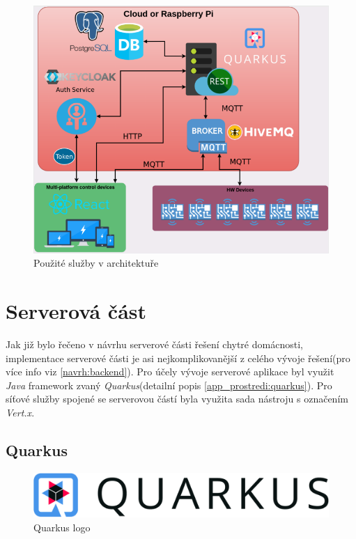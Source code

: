 \begin{figure}[hbt]
  \centering
  \includegraphics[width=0.9 \linewidth]{obrazky-figures/technologie.png}
  \caption{Použité služby v architektuře}
  \label{figure:technologie_architektura}
\end{figure}

\newpage
\section{Serverová část}
\label{pouzite:backend}
Jak již bylo řečeno v návrhu serverové části řešení chytré domácnosti, implementace serverové části je asi nejkomplikovanější z celého vývoje řešení(pro více info viz \ref{navrh:backend}).
Pro účely vývoje serverové aplikace byl využit \emph{Java} framework zvaný \emph{Quarkus}(detailní popis \ref{app_prostredi:quarkus}).
Pro síťové služby spojené se serverovou částí byla využita sada nástroju s označením \emph{Vert.x}.

\subsection*{Quarkus}
\label{pouzite:quarkus}

\begin{figure}[!ht]
  \centering
  \includegraphics[width=.45 \linewidth]{obrazky-figures/quarkus_logo.png}
  \caption{Quarkus logo}
  \label{figure:quarkus_logo}
\end{figure}

